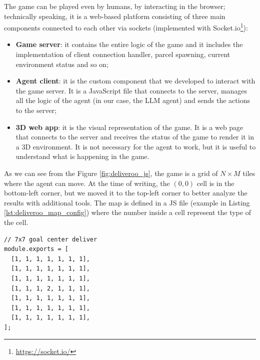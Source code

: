 The game can be played even by humans, by interacting in the browser; technically
speaking, it is a web-based platform consisting of three main components
connected to each other via sockets (implemented with Socket.io\footnote{\url{https://socket.io/}}):
\begin{itemize}
  \item \textbf{Game server}: it contains the entire logic of the game and it includes
    the implementation of client connection handler, parcel spawning, current environment
    status and so on;

  \item \textbf{Agent client}: it is the custom component that we developed to interact
    with the game server. It is a JavaScript file that connects to the server, manages
    all the logic of the agent (in our case, the LLM agent) and sends the
    actions to the server;

  \item \textbf{3D web app}: it is the visual representation of the game. It is
    a web page that connects to the server and receives the status of the game
    to render it in a 3D environment. It is not necessary for the agent to work,
    but it is useful to understand what is happening in the game.
\end{itemize}

As we can see from the Figure \ref{fig:deliveroo_js}, the game is a grid of
$N \times M$ tiles where the agent can move. At the time of writing, the
$(0, 0)$ cell is in the bottom-left corner, but we moved it to the top-left corner
to better analyze the results with additional tools. The map is defined in a JS
file (example in Listing \ref{lst:deliveroo_map_config}) where the number inside
a cell represent the type of the cell.

\vspace{10mm}
\begin{codewindow}
    \begin{lstlisting}
// 7x7 goal center deliver
module.exports = [
  [1, 1, 1, 1, 1, 1, 1],
  [1, 1, 1, 1, 1, 1, 1],
  [1, 1, 1, 1, 1, 1, 1],
  [1, 1, 1, 2, 1, 1, 1],
  [1, 1, 1, 1, 1, 1, 1],
  [1, 1, 1, 1, 1, 1, 1],
  [1, 1, 1, 1, 1, 1, 1],
];
\end{lstlisting}
\end{codewindow}
\vspace{10mm}


